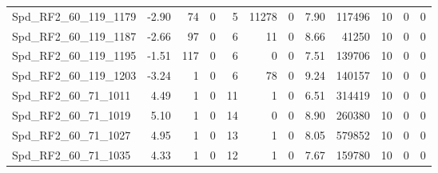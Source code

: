 \begin{longtable}[c]{@{}lrrrrrrrrrrr@{}}
Spd\_RF2\_60\_119\_1179      & -2.90                  & 74                      & 0                       & 5                      & 11278                   & 0                       & 7.90                    & 117496                   & 10                       & 0                        & 0                        \\
Spd\_RF2\_60\_119\_1187      & -2.66                  & 97                      & 0                       & 6                      & 11                      & 0                       & 8.66                    & 41250                    & 10                       & 0                        & 0                        \\
Spd\_RF2\_60\_119\_1195      & -1.51                  & 117                     & 0                       & 6                      & 0                       & 0                       & 7.51                    & 139706                   & 10                       & 0                        & 0                        \\
Spd\_RF2\_60\_119\_1203      & -3.24                  & 1                       & 0                       & 6                      & 78                      & 0                       & 9.24                    & 140157                   & 10                       & 0                        & 0                        \\
Spd\_RF2\_60\_71\_1011       & 4.49                   & 1                       & 0                       & 11                     & 1                       & 0                       & 6.51                    & 314419                   & 10                       & 0                        & 0                        \\
Spd\_RF2\_60\_71\_1019       & 5.10                   & 1                       & 0                       & 14                     & 0                       & 0                       & 8.90                    & 260380                   & 10                       & 0                        & 0                        \\
Spd\_RF2\_60\_71\_1027       & 4.95                   & 1                       & 0                       & 13                     & 1                       & 0                       & 8.05                    & 579852                   & 10                       & 0                        & 0                        \\
Spd\_RF2\_60\_71\_1035       & 4.33                   & 1                       & 0                       & 12                     & 1                       & 0                       & 7.67                    & 159780                   & 10                       & 0                        & 0                        \\

\end{longtable}
